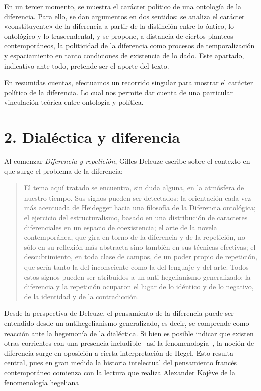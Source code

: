 En un tercer momento, se muestra el carácter político de una ontología de la diferencia. Para ello, se dan argumentos en dos sentidos: se analiza el carácter «constituyente» de la diferencia a partir de la distinción entre lo óntico, lo ontológico y lo trascendental, y se propone, a distancia de ciertos planteos contemporáneos, la politicidad de la diferencia como procesos de temporalización y espaciamiento en tanto condiciones de existencia de lo dado. Este apartado, indicativo ante todo, pretende ser el aporte del texto.

En resumidas cuentas, efectuamos un recorrido singular para mostrar el carácter político de la diferencia. Lo cual nos permite dar cuenta de una particular vinculación teórica entre ontología y política.

\section{2. Dialéctica y diferencia}

Al comenzar \emph{Diferencia y repetición}, Gilles Deleuze escribe sobre el contexto en que surge el problema de la diferencia:

\begin{quote}
El tema aquí tratado se encuentra, sin duda alguna, en la atmósfera de nuestro tiempo. Sus signos pueden ser detectados: la orientación cada vez más acentuada de Heidegger hacia una filosofía de la Diferencia ontológica; el ejercicio del estructuralismo, basado en una distribución de caracteres diferenciales en un espacio de coexistencia; el arte de la novela contemporánea, que gira en torno de la diferencia y de la repetición, no sólo en su reflexión más abstracta sino también en sus técnicas efectivas; el descubrimiento, en toda clase de campos, de un poder propio de repetición, que sería tanto la del inconsciente como la del lenguaje y del arte. Todos estos signos pueden ser atribuidos a un anti-hegelianismo generalizado: la diferencia y la repetición ocuparon el lugar de lo idéntico y de lo negativo, de la identidad y de la contradicción.
\end{quote}


Desde la perspectiva de Deleuze, el pensamiento de la diferencia puede ser entendido desde un antihegelianismo generalizado, es decir, se comprende como reacción ante la hegemonía de la dialéctica. Si bien es posible indicar que existen otras corrientes con una presencia ineludible --así la fenomenología--, la noción de diferencia surge en oposición a cierta interpretación de Hegel. Esto resulta central, pues en gran medida la historia intelectual del pensamiento francés contemporáneo comienza con la lectura que realiza Alexander Kojève de la fenomenología hegeliana

